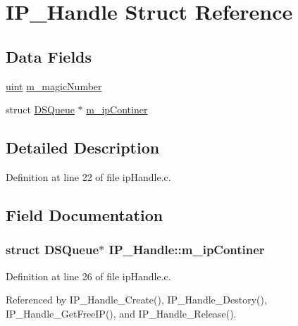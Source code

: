 \hypertarget{structIP__Handle}{}\section{I\+P\+\_\+\+Handle Struct Reference}
\label{structIP__Handle}
\subsection*{Data Fields}
\begin{DoxyCompactItemize}
\item 
\hyperlink{tcp_8h_a91ad9478d81a7aaf2593e8d9c3d06a14}{uint} \hyperlink{structIP__Handle_aa3280409df4f55a4a984f5c590ca2a10}{m\+\_\+magic\+Number}
\item 
struct \hyperlink{structDSQueue}{D\+S\+Queue} $\ast$ \hyperlink{structIP__Handle_a5870bace065b471093927b2077145810}{m\+\_\+ip\+Continer}
\end{DoxyCompactItemize}


\subsection{Detailed Description}


Definition at line 22 of file ip\+Handle.\+c.



\subsection{Field Documentation}
\subsubsection[{\texorpdfstring{m\+\_\+ip\+Continer}{m_ipContiner}}]{\setlength{\rightskip}{0pt plus 5cm}struct {\bf D\+S\+Queue}$\ast$ I\+P\+\_\+\+Handle\+::m\+\_\+ip\+Continer}\hypertarget{structIP__Handle_a5870bace065b471093927b2077145810}{}\label{structIP__Handle_a5870bace065b471093927b2077145810}


Definition at line 26 of file ip\+Handle.\+c.



Referenced by I\+P\+\_\+\+Handle\+\_\+\+Create(), I\+P\+\_\+\+Handle\+\_\+\+Destory(), I\+P\+\_\+\+Handle\+\_\+\+Get\+Free\+I\+P(), and I\+P\+\_\+\+Handle\+\_\+\+Release().

